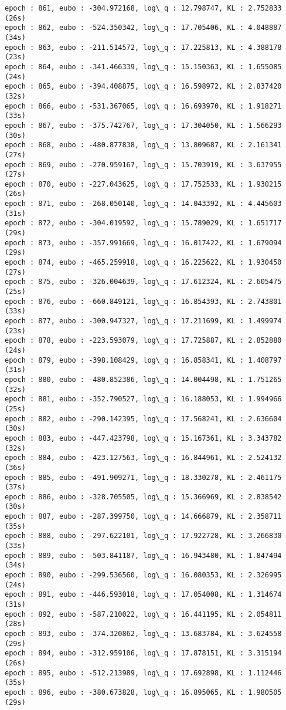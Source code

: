 \documentclass[11pt]{article}
\begin{document}
\begin{Verbatim}[commandchars=\\\{\}]
epoch : 861, eubo : -304.972168, log\_q : 12.798747, KL : 2.752833 (26s)
epoch : 862, eubo : -524.350342, log\_q : 17.705406, KL : 4.048887 (34s)
epoch : 863, eubo : -211.514572, log\_q : 17.225813, KL : 4.388178 (23s)
epoch : 864, eubo : -341.466339, log\_q : 15.150363, KL : 1.655085 (24s)
epoch : 865, eubo : -394.408875, log\_q : 16.598972, KL : 2.837420 (32s)
epoch : 866, eubo : -531.367065, log\_q : 16.693970, KL : 1.918271 (33s)
epoch : 867, eubo : -375.742767, log\_q : 17.304050, KL : 1.566293 (30s)
epoch : 868, eubo : -480.877838, log\_q : 13.809687, KL : 2.161341 (27s)
epoch : 869, eubo : -270.959167, log\_q : 15.703919, KL : 3.637955 (27s)
epoch : 870, eubo : -227.043625, log\_q : 17.752533, KL : 1.930215 (26s)
epoch : 871, eubo : -268.050140, log\_q : 14.043392, KL : 4.445603 (31s)
epoch : 872, eubo : -304.019592, log\_q : 15.789029, KL : 1.651717 (29s)
epoch : 873, eubo : -357.991669, log\_q : 16.017422, KL : 1.679094 (29s)
epoch : 874, eubo : -465.259918, log\_q : 16.225622, KL : 1.930450 (27s)
epoch : 875, eubo : -326.004639, log\_q : 17.612324, KL : 2.605475 (25s)
epoch : 876, eubo : -660.849121, log\_q : 16.854393, KL : 2.743801 (33s)
epoch : 877, eubo : -300.947327, log\_q : 17.211699, KL : 1.499974 (23s)
epoch : 878, eubo : -223.593079, log\_q : 17.725887, KL : 2.852880 (24s)
epoch : 879, eubo : -398.108429, log\_q : 16.858341, KL : 1.408797 (31s)
epoch : 880, eubo : -480.852386, log\_q : 14.004498, KL : 1.751265 (32s)
epoch : 881, eubo : -352.790527, log\_q : 16.188053, KL : 1.994966 (25s)
epoch : 882, eubo : -290.142395, log\_q : 17.568241, KL : 2.636604 (30s)
epoch : 883, eubo : -447.423798, log\_q : 15.167361, KL : 3.343782 (32s)
epoch : 884, eubo : -423.127563, log\_q : 16.844961, KL : 2.524132 (36s)
epoch : 885, eubo : -491.909271, log\_q : 18.330278, KL : 2.461175 (37s)
epoch : 886, eubo : -328.705505, log\_q : 15.366969, KL : 2.838542 (30s)
epoch : 887, eubo : -287.399750, log\_q : 14.666879, KL : 2.358711 (35s)
epoch : 888, eubo : -297.622101, log\_q : 17.922728, KL : 3.266830 (33s)
epoch : 889, eubo : -503.841187, log\_q : 16.943480, KL : 1.847494 (34s)
epoch : 890, eubo : -299.536560, log\_q : 16.080353, KL : 2.326995 (24s)
epoch : 891, eubo : -446.593018, log\_q : 17.054008, KL : 1.314674 (31s)
epoch : 892, eubo : -587.210022, log\_q : 16.441195, KL : 2.054811 (28s)
epoch : 893, eubo : -374.320862, log\_q : 13.683784, KL : 3.624558 (29s)
epoch : 894, eubo : -312.959106, log\_q : 17.878151, KL : 3.315194 (26s)
epoch : 895, eubo : -512.213989, log\_q : 17.692898, KL : 1.112446 (35s)
epoch : 896, eubo : -380.673828, log\_q : 16.895065, KL : 1.980505 (29s)

\end{Verbatim}
\end{document}
